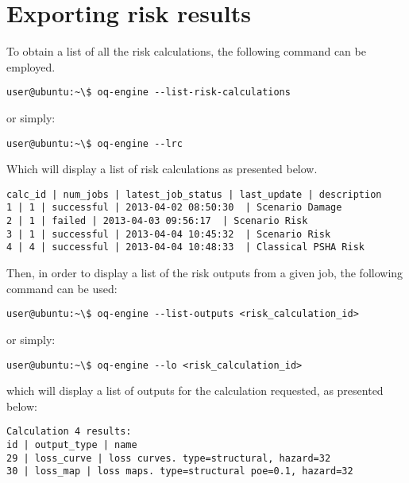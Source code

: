 \section{Exporting risk results}

To obtain a list of all the risk calculations, the following command can be employed.

\begin{Verbatim}[frame=single, commandchars=\\\{\}, samepage=true]
user@ubuntu:~\$ oq-engine --list-risk-calculations
\end{Verbatim}

or simply:

\begin{Verbatim}[frame=single, commandchars=\\\{\}, samepage=true]
user@ubuntu:~\$ oq-engine --lrc
\end{Verbatim}

Which will display a list of risk calculations as presented below.

\begin{Verbatim}[frame=single, commandchars=\\\{\}, samepage=true]
calc_id | num_jobs | latest_job_status | last_update | description
1 | 1 | successful | 2013-04-02 08:50:30  | Scenario Damage
2 | 1 | failed | 2013-04-03 09:56:17  | Scenario Risk
3 | 1 | successful | 2013-04-04 10:45:32  | Scenario Risk
4 | 4 | successful | 2013-04-04 10:48:33  | Classical PSHA Risk
\end{Verbatim}

Then, in order to display a list of the risk outputs from a given job, the
following command can be used:

\begin{Verbatim}[frame=single, commandchars=\\\{\}, samepage=true]
user@ubuntu:~\$ oq-engine --list-outputs <risk_calculation_id>
\end{Verbatim}

or simply:

\begin{Verbatim}[frame=single, commandchars=\\\{\}, samepage=true]
user@ubuntu:~\$ oq-engine --lo <risk_calculation_id>
\end{Verbatim}

which will display a list of outputs for the calculation requested, as
presented below:

\begin{Verbatim}[frame=single, commandchars=\\\{\}, samepage=true]
Calculation 4 results:
id | output_type | name
29 | loss_curve | loss curves. type=structural, hazard=32
30 | loss_map | loss maps. type=structural poe=0.1, hazard=32
\end{Verbatim}



